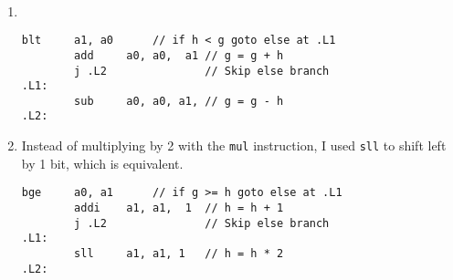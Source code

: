 \documentclass[12pt]{article}
\newenvironment{sol}[1][Solution]{\begin{trivlist}
		\item[\hskip \labelsep {\bfseries #1:}]}{\end{trivlist}}
\begin{document}
\begin{sol}
	\
	\begin{enumerate}[label=(\alph*)]
		\item
		\
		\begin{lstlisting}[language={}]
		blt		a1, a0		// if h < g goto else at .L1
		add		a0, a0,  a1	// g = g + h
		j .L2				// Skip else branch
.L1: 
		sub		a0, a0,	a1,	// g = g - h
.L2:
	\end{lstlisting}
		\item Instead of multiplying by 2 with the \texttt{mul} instruction, I used \texttt{sll} to shift left by
		1 bit, which is equivalent.
		\begin{lstlisting}[language={}]
		bge		a0, a1		// if g >= h goto else at .L1
		addi	a1, a1,  1	// h = h + 1
		j .L2				// Skip else branch
.L1: 
		sll		a1, a1,	1	// h = h * 2
.L2:
		\end{lstlisting}
	\end{enumerate}
\end{sol}
\end{document}
